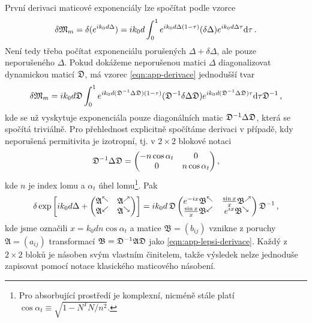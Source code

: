 První derivaci maticové exponenciály lze spočítat podle vzorce\cite{najfeldDerivativesMatrixExponential1995a}
\begin{equation}
    \label{eqn:app-derivace}
    \delta\mathfrak{M}_m = \delta(e^{ik_0d\Delta}) = ik_0d\int_0^1 e^{ik_0d\Delta(1-\tau)} (\delta\Delta) e^{ik_0d\Delta \tau} \textrm{d}\tau \,.
\end{equation}
Není tedy třeba počítat exponenciálu porušených $\Delta+\delta\Delta$, ale pouze neporušeného $\Delta$.
Pokud dokážeme neporušenou matici $\Delta$ diagonalizovat dynamickou maticí $\mathfrak{D}$, má vzorec \eqref{eqn:app-derivace} jednodušší tvar
\begin{equation}
    \label{eqn:app-lepsi-derivace}
    \delta\mathfrak{M}_m = ik_0d \mathfrak{D} \int_0^1 e^{ik_0d (\mathfrak{D}^{-1}\Delta\mathfrak{D})(1-\tau)} (\mathfrak{D}^{-1}\delta\Delta\mathfrak{D}) e^{ik_0d(\mathfrak{D}^{-1}\Delta\mathfrak{D})\tau} \textrm{d}\tau \mathfrak{D}^{-1}\,,
\end{equation}
kde se už vyskytuje exponenciála pouze diagonálních matic $\mathfrak{D}^{-1}\Delta\mathfrak{D}$, která se spočítá triviálně.
Pro přehlednost explicitně spočítáme derivaci v případě, kdy neporušená permitivita je izotropní, tj. v $2\times2$ blokové notaci
\begin{equation}
    \mathfrak{D}^{-1}\Delta\mathfrak{D} = \begin{pmatrix} -n\cos\alpha_t & 0 \\ 0 & n\cos\alpha_t \end{pmatrix} ,
\end{equation}
kde $n$ je index lomu a $\alpha_t$ úhel lomu\footnote{Pro absorbující prostředí je komplexní, nicméně stále platí $\cos\alpha_t\equiv\sqrt{1-N^TN/n^2}$.}.
Pak
\begin{equation}
    \label{eqn:app-zmena-exp}
    \delta \exp \left[ik_0d\Delta+ \begin{pmatrix} 
\mathfrak{A}^\nwarrow & \mathfrak{A}^\nearrow \\
\mathfrak{A}^\swarrow & \mathfrak{A}^\searrow
\end{pmatrix} \right] = ik_0d \, \mathfrak{D}
\begin{pmatrix} 
    e^{-ix}\mathfrak{B}^\nwarrow & \frac{\sin x}{x}\mathfrak{B}^\nearrow \\
    \frac{\sin x}{x}\mathfrak{B}^\swarrow & e^{ix}\mathfrak{B}^\searrow
\end{pmatrix} \mathfrak{D}^{-1} \,,
\end{equation}
kde jsme označili $x = k_0 d n \cos\alpha_t$ a matice $\mathfrak{B} = (b_{ij})$ vznikne z poruchy $\mathfrak{A} = (a_{ij})$ transformací $\mathfrak{B} = \mathfrak{D}^{-1} \mathfrak{A} \mathfrak{D}$ jako \eqref{eqn:app-lepsi-derivace}.
Každý z $2\times2$ bloků je násoben svým vlastním činitelem, takže výsledek nelze jednoduše zapisovat pomocí notace klasického maticového násobení.

